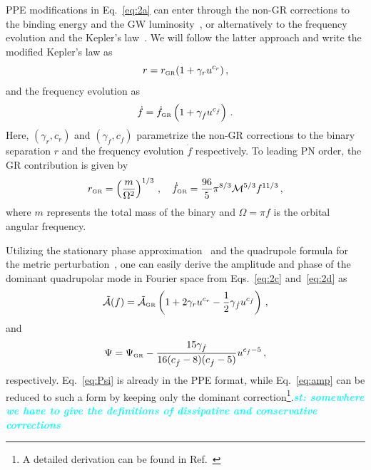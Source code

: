 \documentclass[prd,twocolumn,nofootinbib]{revtex4-1}
\newcommand\be{\begin{equation}}
\newcommand\ee{\end{equation}}
\newcommand{\lb}{\left(}
\newcommand{\rb}{\right)}
\newcommand{\GR}{{\mbox{\tiny GR}}}
\newcommand{\st}[1]{\textcolor{cyan}{\it{\textbf{st: #1}}} }
\begin{document}
PPE modifications in Eq.~\eqref{eq:2a} can enter through the non-GR corrections to the binding energy and the GW luminosity~\cite{Yunes:2009ke,Chatziioannou:2012rf}, or alternatively to the frequency evolution and the Kepler's law~\cite{Tahura:2018zuq}. We will follow the latter approach and write the modified Kepler's law as
\begin{equation}
 \label{eq:2c}
 r=r_{\GR}(1+\gamma_r u^{c_r})\,,
 \end{equation}
and the frequency evolution as
\begin{equation}\label{eq:2d}
\dot{f}=\dot{f}_{\GR}\left(1+\gamma_{\dot{f}}u^{c_{\dot{f}}}\right)\,.
\end{equation}
Here, $\lb\gamma_r,c_r\rb$ and $\lb\gamma_{\dot{f}},c_{\dot{f}}\rb$ parametrize the non-GR corrections to the binary separation $r$ and the frequency evolution $\dot{f}$ respectively. To leading PN order, the GR contribution is given by~\cite{cutlerflanagan,Blanchet:1995ez}
\begin{equation}
r_{\GR}=\left(\frac{m}{\Omega^2}\right)^{1/3}\,, \quad
\dot{f}_{\GR}=\frac{96}{5}\pi^{8/3}\mathcal{M}^{5/3}f^{11/3}\,,
\end{equation}
where $m$ represents the total mass of the binary and $\Omega=\pi f$ is the orbital angular frequency.

Utilizing the stationary phase approximation~\cite{PhysRevD.62.084036,Yunes:2009yz} and the quadrupole formula for the metric perturbation~\cite{Blanchet:2002av}, one can easily derive the amplitude and phase of the dominant quadrupolar mode in Fourier space from Eqs.~\eqref{eq:2c} and~\eqref{eq:2d} as
\begin{equation}\label{eq:amp}
\tilde{\mathcal{A}}(f)=\tilde{\mathcal{A}}_{\GR} \left(1+2\gamma_ru^{c_r}-\frac{1}{2}\gamma_{\dot{f}}u^{c_{\dot{f}}}\right)\,,
\end{equation}
and
\be
\label{eq:Psi}
\Psi = \Psi_\GR  -\frac{15 \text{$\gamma_{\dot{f}} $}}{16 (\text{$c_{\dot{f}}$}-8) (\text{$c_{\dot{f}}$}-5)} u^{c_{\dot{f}}-5}\,,
\ee
respectively. Eq.~\eqref{eq:Psi} is already in the PPE format, while  Eq.~\eqref{eq:amp} can be reduced to such a form by keeping only the dominant correction\footnote{A detailed derivation can be found in Ref.~\cite{Tahura:2018zuq}}.\st{somewhere we have to give the definitions of dissipative and conservative corrections}
\end{document}
